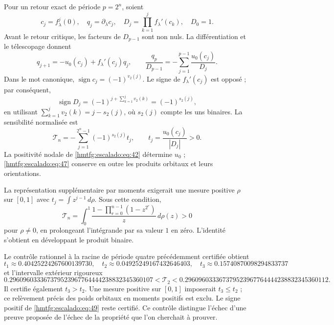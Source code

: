 Pour un retour exact de période \(p=2^n\), soient
\[
c_j=f_\lambda^j(0),\quad q_j=\partial_\lambda c_j,\quad
D_j=\prod_{k=1}^j f_\lambda'(c_k),\quad D_0=1.
\]
Avant le retour critique, les facteurs de \(D_{p-1}\) sont non nuls. La différentiation et le télescopage donnent
\begin{equation}
q_{j+1}=-u_0(c_j)+f_\lambda'(c_j)q_j,\qquad
\boxed{\frac{q_p}{D_{p-1}}
=-\sum_{j=1}^{p-1}\frac{u_0(c_j)}{D_j}.}
\label{hmtfg:escalado:eq:45}
\end{equation}
Dans le mot canonique, \(\operatorname{sign}c_j=(-1)^{v_2(j)}\). Le signe de \(f_\lambda'(c_j)\) est opposé ; par conséquent,
\begin{equation}
\operatorname{sign}D_j=(-1)^{j+\sum_{k=1}^jv_2(k)}
=(-1)^{s_2(j)},
\label{hmtfg:escalado:eq:46}
\end{equation}
en utilisant \(\sum_{k=1}^jv_2(k)=j-s_2(j)\), où \(s_2(j)\) compte les uns binaires. La sensibilité normalisée est
\begin{equation}
\mathcal T_n=-\sum_{j=1}^{2^n-1}(-1)^{s_2(j)}t_j,\qquad
t_j=\frac{u_0(c_j)}{|D_j|}>0.
\label{hmtfg:escalado:eq:47}
\end{equation}
La positivité nodale de \eqref{hmtfg:escalado:eq:42} détermine \(u_0\) ; \eqref{hmtfg:escalado:eq:47} conserve en outre les produits orbitaux et leurs orientations.

La représentation supplémentaire par moments exigerait une mesure positive \(\rho\) sur \([0,1]\) avec \(t_j=\int z^{j-1}\,d\rho\). Sous cette condition,
\begin{equation}
\mathcal T_n=\int_0^1
\frac{1-\prod_{r=0}^{n-1}(1-z^{2^r})}{z}\,d\rho(z)>0
\label{hmtfg:escalado:eq:48}
\end{equation}
pour \(\rho\ne0\), en prolongeant l’intégrande par sa valeur \(1\) en zéro. L’identité s’obtient en développant le produit binaire.

Le contrôle rationnel à la racine de période quatre précédemment certifiée obtient
\[
t_1\approx0.40425224267600139730,\quad
t_2\approx0.04925249167432646403,\quad
t_3\approx0.15740870098294833737
\]
et l’intervalle extérieur rigoureux
\begin{equation}
0.296096033367379523967764444238832345360107
<\mathcal T_2<
0.296096033367379523967764444238832345360112.
\label{hmtfg:escalado:eq:49}
\end{equation}
Il certifie également \(t_3>t_2\). Une mesure positive sur \([0,1]\) imposerait \(t_3\le t_2\) ; ce relèvement précis des poids orbitaux en moments positifs est exclu. Le signe positif de \eqref{hmtfg:escalado:eq:49} reste certifié. Ce contrôle distingue l’échec d’une preuve proposée de l’échec de la propriété que l’on cherchait à prouver.
